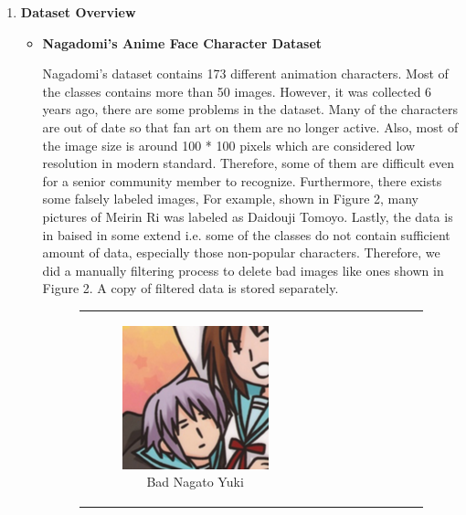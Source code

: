 \documentclass[11.5pt]{article}
\begin{document}
    \begin{enumerate}
        \item \textbf{Dataset Overview}
        \begin{itemize}
            \item \textbf{Nagadomi's Anime Face Character Dataset}

            Nagadomi's dataset contains 173 different animation characters.
            Most of the classes contains more than 50 images.
            However, it was collected 6 years ago, there are some problems in the dataset.
            Many of the characters are out of date so that fan art on them are no longer active.
            Also, most of the image size is around 100 * 100 pixels which are considered low resolution in modern standard.
            Therefore, some of them are difficult even for a senior community member to recognize.
            Furthermore, there exists some falsely labeled images, For example, shown in Figure 2, many pictures of Meirin Ri was labeled as Daidouji Tomoyo.
            Lastly, the data is in baised in some extend i.e. some of the classes do not contain sufficient amount of data, especially those non-popular characters.
            Therefore, we did a manually filtering process to delete bad images like ones shown in Figure 2.
            A copy of filtered data is stored separately.
            \begin{figure}[h!]
                \centering
                \begin{tabular}[c]{cccc}
                    \begin{subfigure}[h]{0.2\linewidth}
                        \centering
                        \includegraphics[width=0.5\linewidth, scale=0.5]{images/face_145_303_113.png}
                        \caption{Bad Nagato Yuki}
                    \end{subfigure} &
                    \begin{subfigure}[h]{0.2\linewidth}

\end{subfigure}
\end{tabular}
\end{figure}
\end{itemize}
\end{enumerate}
\end{document}
